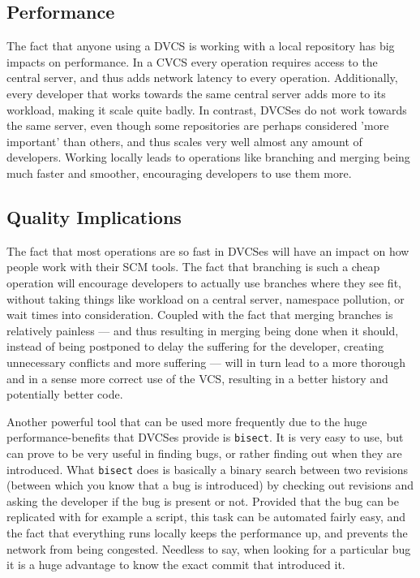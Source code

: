 \documentclass{llncs}
\begin{document}



\subsection{Performance}

The fact that anyone using a DVCS is working with a local repository
has big impacts on performance. In a CVCS every operation requires
access to the central server, and thus adds network latency to every
operation. Additionally, every developer that works towards the same
central server adds more to its workload, making it scale quite
badly. In contrast, DVCSes do not work towards the same server, even
though some repositories are perhaps considered 'more important' than
others, and thus scales very well almost any amount of
developers. Working locally leads to operations like branching and
merging being much faster and smoother, encouraging developers to use
them more\cite{alwis09}.

\subsection{Quality Implications}

The fact that most operations are so fast in DVCSes will have an
impact on how people work with their SCM tools. The fact that
branching is such a cheap operation will encourage developers to
actually use branches where they see fit, without taking things like
workload on a central server, namespace pollution, or wait times into
consideration. Coupled with the fact that merging branches is
relatively painless --- and thus resulting in merging being done when it
should, instead of being postponed to delay the suffering for the
developer, creating unnecessary conflicts and more suffering --- will
in turn lead to a more thorough and in a sense more correct use of the
VCS, resulting in a better history and potentially better code.

Another powerful tool that can be used more frequently due to the huge
performance-benefits that DVCSes provide is \verb!bisect!. It is very
easy to use, but can prove to be very useful in finding bugs, or
rather finding out when they are introduced. What \verb!bisect! does
is basically a binary search between two revisions (between which you
know that a bug is introduced) by checking out revisions and asking
the developer if the bug is present or not. Provided that the bug can
be replicated with for example a script, this task can be automated
fairly easy, and the fact that everything runs locally keeps the
performance up, and prevents the network from being congested.
Needless to say, when looking for a particular bug it is a huge
advantage to know the exact commit that introduced it.
\end{document}
